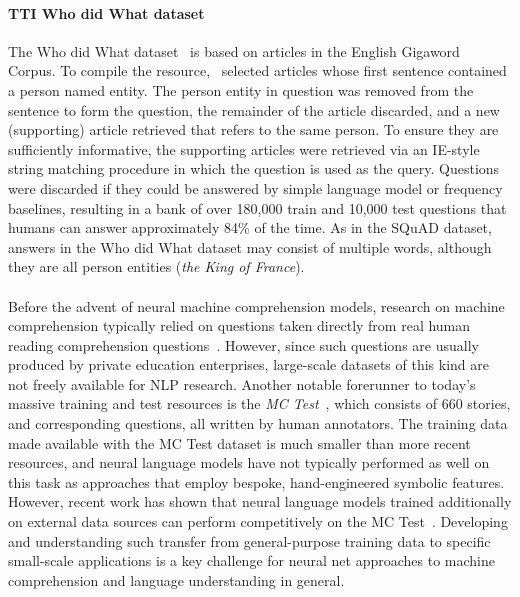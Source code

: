 \documentclass[11pt,letterpaper]{article}
\begin{document}
 \paragraph{TTI Who did What dataset} The Who did What dataset~\cite{onishi2016did} is based on articles in the English Gigaword Corpus. To compile the resource,~ selected articles whose first sentence contained a person named entity. The person entity in question was removed from the sentence to form the question, the remainder of the article discarded, and a new (supporting) article retrieved that refers to the same person. To ensure they are sufficiently informative, the supporting articles were retrieved via an IE-style string matching procedure in which the question is used as the query. Questions were discarded if they could be answered by simple language model or frequency baselines, resulting in a bank of over 180,000 train and 10,000 test questions that humans can answer approximately 84\% of the time. As in the SQuAD dataset, answers in the Who did What dataset may consist of multiple words, although they are all person entities (\emph{the King of France}).

\paragraph{}Before the advent of neural machine comprehension models, research on machine comprehension typically relied on questions taken directly from real human reading comprehension questions~\cite{hirschman1999deep}. However, since such questions are usually produced by private education enterprises, large-scale datasets of this kind are not freely available for NLP research. Another notable forerunner to today's massive training and test resources is the \emph{MC Test}~\cite{richardson2013mctest}, which consists of 660 stories, and corresponding questions, all written by human annotators. The training data made available with the MC Test dataset is much smaller than more recent resources, and neural language models have not typically performed as well on this task as approaches that employ bespoke, hand-engineered symbolic features. However, recent work has shown that neural language models trained additionally on external data sources can perform competitively on the MC Test~\cite{trischler2016parallel}. Developing and understanding such transfer from general-purpose training data to specific small-scale applications is a key challenge for neural net approaches to machine comprehension and language understanding in general. 
\end{document}
